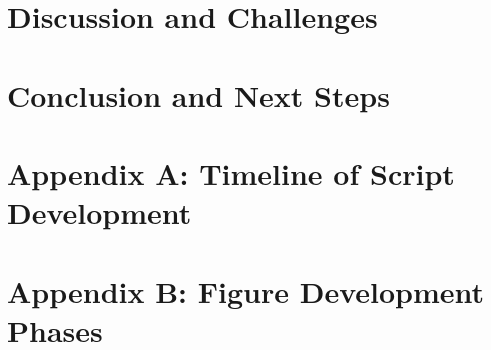 \documentclass[12pt]{article}
\begin{document}

\section{Discussion and Challenges}
\label{sec:discussion}


\section{Conclusion and Next Steps}
\label{sec:conclusion}


\appendix

\section{Appendix A: Timeline of Script Development}
\label{appendix:scripts}

\section{Appendix B: Figure Development Phases}
\label{appendix:figures}
\end{document}

